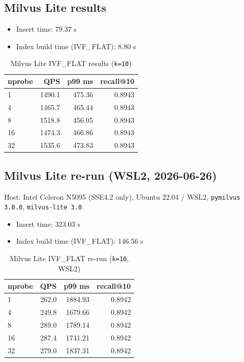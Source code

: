 \documentclass[11pt,a4paper]{article}
\begin{document}
\subsection{Milvus Lite results}

\begin{itemize}[leftmargin=*]
  \item Insert time: 79.37 s
  \item Index build time (IVF\_FLAT): 8.80 s
\end{itemize}

\begin{table}[h]
\centering
\caption{Milvus Lite IVF\_FLAT results (\texttt{k=10})}
\begin{tabular}{@{}lrrr@{}}
\toprule
\textbf{nprobe} & \textbf{QPS} & \textbf{p99 ms} & \textbf{recall@10} \\
\midrule
1  & 1490.1 & 475.36 & 0.8943 \\
4  & 1465.7 & 465.44 & 0.8943 \\
8  & 1518.8 & 456.05 & 0.8943 \\
16 & 1474.3 & 466.86 & 0.8943 \\
32 & 1535.6 & 473.83 & 0.8943 \\
\bottomrule
\end{tabular}
\end{table}

\subsection{Milvus Lite re-run (WSL2, 2026-06-26)}

Host: Intel Celeron N5095 (SSE4.2 only), Ubuntu 22.04 / WSL2,
\texttt{pymilvus 3.0.0}, \texttt{milvus-lite 3.0}.

\begin{itemize}[leftmargin=*]
  \item Insert time: 323.03 s
  \item Index build time (IVF\_FLAT): 146.56 s
\end{itemize}

\begin{table}[h]
\centering
\caption{Milvus Lite IVF\_FLAT re-run (\texttt{k=10}, WSL2)}
\begin{tabular}{@{}lrrr@{}}
\toprule
\textbf{nprobe} & \textbf{QPS} & \textbf{p99 ms} & \textbf{recall@10} \\
\midrule
1  &  262.0 & 1884.93 & 0.8942 \\
4  &  249.8 & 1679.66 & 0.8942 \\
8  &  289.0 & 1789.14 & 0.8942 \\
16 &  287.4 & 1741.21 & 0.8942 \\
32 &  279.0 & 1837.31 & 0.8942 \\
\bottomrule
\end{tabular}
\end{table}
\end{document}
